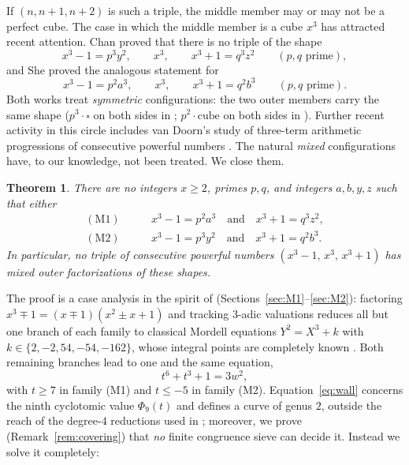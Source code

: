 \documentclass[11pt]{article}
\newtheorem{theorem}{Theorem}
\theoremstyle{remark}
\begin{document}
If $(n,n+1,n+2)$ is such a triple, the middle member may or may not be a perfect cube. The case in which the middle member is a cube $x^3$ has attracted recent attention. Chan \cite{Chan2025} proved that there is no triple of the shape
\[
x^3-1=p^3y^2,\qquad x^3,\qquad x^3+1=q^3z^2 \qquad (p,q \text{ prime}),
\]
and She \cite{She2025} proved the analogous statement for
\[
x^3-1=p^2a^3,\qquad x^3,\qquad x^3+1=q^2b^3 \qquad (p,q \text{ prime}).
\]
Both works treat \emph{symmetric} configurations: the two outer members carry the same shape ($p^3\cdot\square$ on both sides in \cite{Chan2025}; $p^2\cdot\text{cube}$ on both sides in \cite{She2025}). Further recent activity in this circle includes van Doorn's study of three-term arithmetic progressions of consecutive powerful numbers \cite{vanDoorn}. The natural \emph{mixed} configurations have, to our knowledge, not been treated. We close them.

\begin{theorem}\label{thm:main}
There are no integers $x\ge 2$, primes $p,q$, and integers $a,b,y,z$ such that either
\begin{align}
\mathrm{(M1)}\qquad & x^3-1=p^2a^3 \quad\text{and}\quad x^3+1=q^3z^2, \label{eq:M1}\\
\mathrm{(M2)}\qquad & x^3-1=p^3y^2 \quad\text{and}\quad x^3+1=q^2b^3. \label{eq:M2}
\end{align}
In particular, no triple of consecutive powerful numbers $(x^3-1,\,x^3,\,x^3+1)$ has mixed outer factorizations of these shapes.
\end{theorem}

The proof is a case analysis in the spirit of \cite{Chan2025,She2025} (Sections~\ref{sec:M1}--\ref{sec:M2}): factoring $x^3\mp 1=(x\mp 1)(x^2\pm x+1)$ and tracking $3$-adic valuations reduces all but one branch of each family to classical Mordell equations $Y^2=X^3+k$ with $k\in\{2,-2,54,-54,-162\}$, whose integral points are completely known \cite{GPZ,BennettGhadermarzi,LMFDB}. Both remaining branches lead to one and the same equation,
\begin{equation}\label{eq:wall}
t^6+t^3+1=3w^2,
\end{equation}
with $t\ge 7$ in family (M1) and $t\le -5$ in family (M2). Equation~\eqref{eq:wall} concerns the ninth cyclotomic value $\Phi_9(t)$ and defines a curve of genus $2$, outside the reach of the degree-$4$ reductions used in \cite{Chan2025,She2025}; moreover, we prove (Remark~\ref{rem:covering}) that \emph{no} finite congruence sieve can decide it. Instead we solve it completely:
\end{document}
